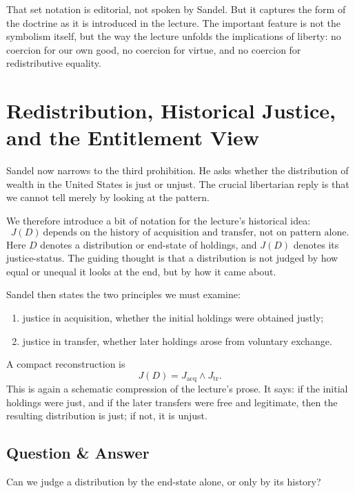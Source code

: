 That set notation is editorial, not spoken by Sandel. But it captures the form of the doctrine as it is introduced in the lecture. The important feature is not the symbolism itself, but the way the lecture unfolds the implications of liberty: no coercion for our own good, no coercion for virtue, and no coercion for redistributive equality.

\section{Redistribution, Historical Justice, and the Entitlement View}

Sandel now narrows to the third prohibition. He asks whether the distribution of wealth in the United States is just or unjust. The crucial libertarian reply is that we cannot tell merely by looking at the pattern.

We therefore introduce a bit of notation for the lecture's historical idea:
\begin{equation}
J(D)\ \text{depends on the history of acquisition and transfer, not on pattern alone}.
\end{equation}
Here \(D\) denotes a distribution or end-state of holdings, and \(J(D)\) denotes its justice-status. The guiding thought is that a distribution is not judged by how equal or unequal it looks at the end, but by how it came about.

Sandel then states the two principles we must examine:
\begin{enumerate}
\item justice in acquisition, whether the initial holdings were obtained justly;
\item justice in transfer, whether later holdings arose from voluntary exchange.
\end{enumerate}

A compact reconstruction is
\begin{equation}
J(D)=J_{\mathrm{acq}} \land J_{\mathrm{tr}}.
\end{equation}
This is again a schematic compression of the lecture's prose. It says: if the initial holdings were just, and if the later transfers were free and legitimate, then the resulting distribution is just; if not, it is unjust.

\subsection{Question \& Answer}

Can we judge a distribution by the end-state alone, or only by its history?

